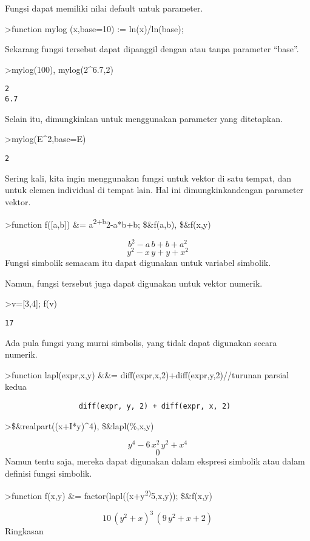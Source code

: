 \documentclass[
]{book}
\begin{document}
Fungsi dapat memiliki nilai default untuk parameter.

\textgreater function mylog (x,base=10) := ln(x)/ln(base);

Sekarang fungsi tersebut dapat dipanggil dengan atau tanpa parameter ``base''.

\textgreater mylog(100), mylog(2\^{}6.7,2)

\begin{verbatim}
2
6.7
\end{verbatim}

Selain itu, dimungkinkan untuk menggunakan parameter yang ditetapkan.

\textgreater mylog(E\^{}2,base=E)

\begin{verbatim}
2
\end{verbatim}

Sering kali, kita ingin menggunakan fungsi untuk vektor di satu tempat, dan untuk elemen individual di tempat lain. Hal ini dimungkinkandengan parameter vektor.

\textgreater function f({[}a,b{]}) \&= a\textsuperscript{2+b}2-a*b+b; \$\&f(a,b), \$\&f(x,y)

\[b^2-a\,b+b+a^2\] \[y^2-x\,y+y+x^2\] Fungsi simbolik semacam itu dapat digunakan untuk variabel simbolik.

Namun, fungsi tersebut juga dapat digunakan untuk vektor numerik.

\textgreater v={[}3,4{]}; f(v)

\begin{verbatim}
17
\end{verbatim}

Ada pula fungsi yang murni simbolis, yang tidak dapat digunakan secara numerik.

\textgreater function lapl(expr,x,y) \&\&= diff(expr,x,2)+diff(expr,y,2)//turunan parsial kedua

\begin{verbatim}
                 diff(expr, y, 2) + diff(expr, x, 2)
\end{verbatim}

\textgreater\$\&realpart((x+I*y)\^{}4), \$\&lapl(\%,x,y)

\[y^4-6\,x^2\,y^2+x^4\] \[0\] Namun tentu saja, mereka dapat digunakan dalam ekspresi simbolik atau dalam definisi fungsi simbolik.

\textgreater function f(x,y) \&= factor(lapl((x+y\textsuperscript{2)}5,x,y)); \$\&f(x,y)

\[10\,\left(y^2+x\right)^3\,\left(9\,y^2+x+2\right)\]Ringkasan
\end{document}
